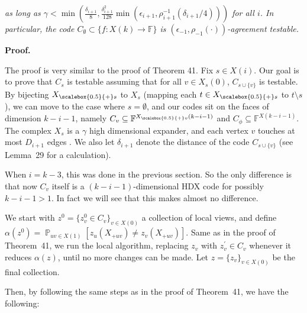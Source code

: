 \documentclass[10pt,a4paper]{article}
\begin{document}
\emph{as long as $\gamma<\min\left(\frac{\delta_{i+1}}{8},\frac{\delta_{i+1}^{2}}{128}\min\left(\epsilon_{i+1},\rho_{i+1}^{-1}(\delta_{i+1}/4)\right)\right)$ for all $i$.
In particular, the code $C_{\emptyset}\subset\{f:X(k)\to\mathbb{F}\}$ is $(\epsilon_{-1},\rho_{-1}(\cdot))$-agreement testable.}\par






\par\medskip\noindent\textbf{Proof.}\par




The proof is very similar to the proof of Theorem 41. Fix $s\in X(i)$. Our goal is to prove that $C_{s}$ is testable assuming that for all $v\in X_{s}(0)$, $C_{s\cup\{v\}}$ is testable. By bijecting ${X}_{\scalebox{0.5}{+}s}$ to $X_{s}$ (mapping each $t\in{X}_{\scalebox{0.5}{+}s}$ to $t\setminus s$), we can move to the case where $s=\emptyset$, and our codes sit on the faces of dimension $k-i-1$, namely $C_{v}\subseteq\mathbb{F}^{{X}_{\scalebox{0.5}{+}v}(k-i-1)}$ and $C_{\phi}\subseteq\mathbb{F}^{X(k-i-1)}$. The complex $X_{s}$ is a $\gamma$ high dimensional expander, and each vertex $v$ touches at most $D_{i+1}$ edges . We also let $\delta_{i+1}$ denote the distance of the code $C_{s\cup\{v\}}$ (see Lemma 29 for a calculation).\par




When $i=k-3$, this was done in the previous section. So the only difference is that now $C_{v}$ itself is a $(k-i-1)$-dimensional HDX code for possibly $k-i-1>1$. In fact we will see that this makes almost no difference.\par




We start with $z^{0}=\{z^{0}_{v}\in C_{v}\}_{v\in X(0)}$ a collection of local views, and define $\alpha(z^{0})=\operatorname*{\mathbb{P}}_{uv\in X(1)}[z_{u}(X_{+uv})\not=z_{v}(X_{+uv})]$. Same as in the proof of Theorem 41, we run the local algorithm, replacing $z_{v}$ with $z^{\prime}_{v}\in C_{v}$ whenever it reduces $\alpha(z)$, until no more changes can be made. Let $z=\{z_{v}\}_{v\in X(0)}$ be the final collection.\par




Then, by following the same steps as in the proof of Theorem 41, we have the following:\par
\end{document}
